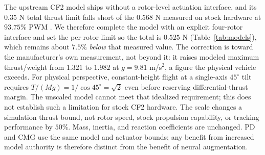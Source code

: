\documentclass[letterpaper, 10 pt, conference]{ieeeconf}
\begin{document}
The upstream CF2 model ships without a rotor-level actuation interface, and
its $0.35$ N total thrust limit falls short of the $0.568$ N measured on
stock hardware at $93.75\%$ PWM \cite{bitcrazeThrustMeasurements}. We
therefore complete the model with an explicit four-rotor interface and set
the per-rotor limit so the total is $0.525$ N (Table~\ref{tab:models}),
which remains about $7.5\%$ \emph{below} that measured value. The
correction is toward the manufacturer's own measurement, not beyond it: it
raises modeled maximum thrust/weight from $1.321$ to $1.982$ at
$g=9.81$ m/s$^2$, a figure the physical vehicle exceeds. For physical perspective,
constant-height flight at a single-axis $45^\circ$ tilt requires
$T/(Mg)=1/\cos45^\circ=\sqrt{2}$ even before reserving differential-thrust
margin. The unscaled model cannot meet that idealized requirement; this
does not establish such a limitation for stock CF2 hardware. The scale
changes a simulation thrust bound, not rotor speed, stock propulsion
capability, or tracking performance by $50\%$. Mass, inertia, and reaction
coefficients are unchanged. PD and CMG use the same model and actuator
bounds; any benefit from increased model authority is therefore distinct
from the benefit of neural augmentation.
\end{document}
